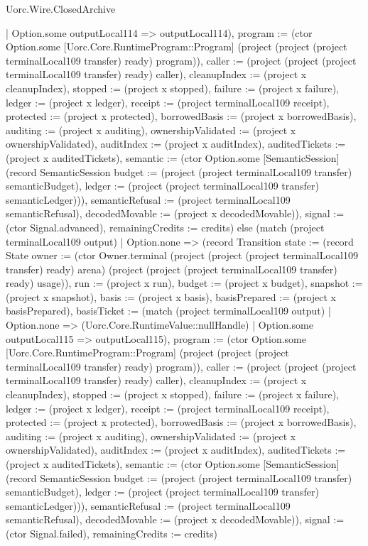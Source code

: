\begin{lexlean}{Uorc.Wire.ClosedArchive}
\begin{semanticmodule}
{{{            | Option.some outputLocal114 => outputLocal114), program := (ctor Option.some [Uorc.Core.RuntimeProgram::Program] (project (project (project terminalLocal109 transfer) ready) program)), caller := (project (project (project terminalLocal109 transfer) ready) caller), cleanupIndex := (project x cleanupIndex), stopped := (project x stopped), failure := (project x failure), ledger := (project x ledger), receipt := (project terminalLocal109 receipt), protected := (project x protected), borrowedBasis := (project x borrowedBasis), auditing := (project x auditing), ownershipValidated := (project x ownershipValidated), auditIndex := (project x auditIndex), auditedTickets := (project x auditedTickets), semantic := (ctor Option.some [SemanticSession] (record SemanticSession {budget := (project (project terminalLocal109 transfer) semanticBudget), ledger := (project (project terminalLocal109 transfer) semanticLedger)})), semanticRefusal := (project terminalLocal109 semanticRefusal), decodedMovable := (project x decodedMovable)}), signal := (ctor Signal.advanced), remainingCredits := credits}) else (match (project terminalLocal109 output)
            | Option.none => (record Transition {state := (record State {owner := (ctor Owner.terminal (project (project (project terminalLocal109 transfer) ready) arena) (project (project (project terminalLocal109 transfer) ready) usage)), run := (project x run), budget := (project x budget), snapshot := (project x snapshot), basis := (project x basis), basisPrepared := (project x basisPrepared), basisTicket := (match (project terminalLocal109 output)
              | Option.none => (Uorc.Core.RuntimeValue::nullHandle)
              | Option.some outputLocal115 => outputLocal115), program := (ctor Option.some [Uorc.Core.RuntimeProgram::Program] (project (project (project terminalLocal109 transfer) ready) program)), caller := (project (project (project terminalLocal109 transfer) ready) caller), cleanupIndex := (project x cleanupIndex), stopped := (project x stopped), failure := (project x failure), ledger := (project x ledger), receipt := (project terminalLocal109 receipt), protected := (project x protected), borrowedBasis := (project x borrowedBasis), auditing := (project x auditing), ownershipValidated := (project x ownershipValidated), auditIndex := (project x auditIndex), auditedTickets := (project x auditedTickets), semantic := (ctor Option.some [SemanticSession] (record SemanticSession {budget := (project (project terminalLocal109 transfer) semanticBudget), ledger := (project (project terminalLocal109 transfer) semanticLedger)})), semanticRefusal := (project terminalLocal109 semanticRefusal), decodedMovable := (project x decodedMovable)}), signal := (ctor Signal.failed), remainingCredits := credits})
}
\end{semanticmodule}
\end{lexlean}
